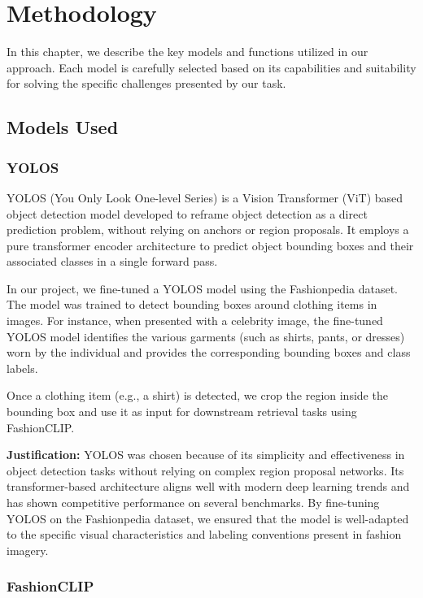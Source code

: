 \chapter{Methodology}
\label{chap:methodology}

In this chapter, we describe the key models and functions utilized in our approach. Each model is carefully selected based on its capabilities and suitability for solving the specific challenges presented by our task.

\section{Models Used}

\subsection{YOLOS}

YOLOS (You Only Look One-level Series) is a Vision Transformer (ViT) based object detection model developed to reframe object detection as a direct prediction problem, without relying on anchors or region proposals. It employs a pure transformer encoder architecture to predict object bounding boxes and their associated classes in a single forward pass.

In our project, we fine-tuned a YOLOS model using the Fashionpedia dataset. The model was trained to detect bounding boxes around clothing items in images. For instance, when presented with a celebrity image, the fine-tuned YOLOS model identifies the various garments (such as shirts, pants, or dresses) worn by the individual and provides the corresponding bounding boxes and class labels.

Once a clothing item (e.g., a shirt) is detected, we crop the region inside the bounding box and use it as input for downstream retrieval tasks using FashionCLIP.

\textbf{Justification:} YOLOS was chosen because of its simplicity and effectiveness in object detection tasks without relying on complex region proposal networks. Its transformer-based architecture aligns well with modern deep learning trends and has shown competitive performance on several benchmarks. By fine-tuning YOLOS on the Fashionpedia dataset, we ensured that the model is well-adapted to the specific visual characteristics and labeling conventions present in fashion imagery.

\subsection{FashionCLIP}

